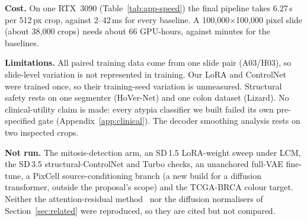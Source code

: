 \textbf{Cost.} On one RTX~3090 (Table~\ref{tab:app-speed}) the final pipeline takes 6.27\,s per 512\,px
crop, against 2--42\,ms for every baseline. A 100{,}000$\times$100{,}000 pixel slide (about 38{,}000
crops) needs about 66 GPU-hours, against minutes for the baselines.

\textbf{Limitations.} All paired training data come from one slide pair (A03/H03), so slide-level variation is
not represented in training. Our LoRA and ControlNet were trained once, so their training-seed variation is unmeasured. Structural
safety rests on one segmenter (HoVer-Net) and one colon dataset (Lizard). No clinical-utility claim is made: every atypia
classifier we built failed its own pre-specified gate (Appendix~\ref{app:clinical}). The decoder smoothing analysis
rests on two inspected crops.

\textbf{Not run.} The mitosis-detection arm, an SD\,1.5 LoRA-weight sweep under LCM, the SD\,3.5 structural-ControlNet and Turbo checks, an
unanchored full-VAE fine-tune, a PixCell source-conditioning branch (a new build for a diffusion transformer, outside the proposal's scope) and the TCGA-BRCA colour target. Neither
the attention-residual method~\cite{madusanka2025attentionresidual} nor the diffusion normalisers of
Section~\ref{sec:related} were reproduced, so they are cited but not compared.
